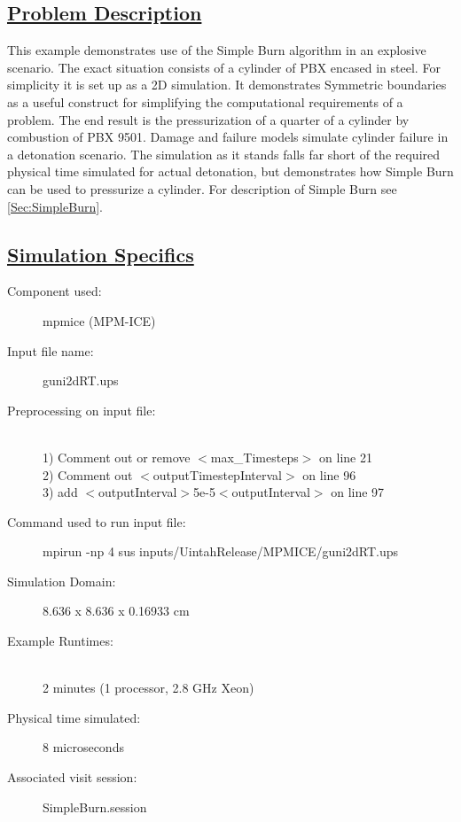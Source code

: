 \subsection*{\underline{Problem Description}}
This example demonstrates use of the Simple Burn algorithm in an explosive scenario.  
The exact situation consists of a cylinder of PBX encased in steel.  For simplicity it is set up 
as a 2D simulation.  It demonstrates Symmetric boundaries as a useful construct for simplifying
the computational requirements of a problem.  The end result is the pressurization of a quarter
of a cylinder by combustion of PBX 9501.  Damage and failure models simulate cylinder failure
in a detonation scenario.  The simulation as it stands falls far short of the required physical time 
simulated for actual detonation, but demonstrates how Simple Burn can be used to pressurize 
a cylinder.  For description of Simple Burn see \ref{Sec:SimpleBurn}.

\subsection*{\underline{Simulation Specifics}}
\begin{description}
\item [Component used:] \hfill mpmice (MPM-ICE)
\item [Input file name:] \hfill guni2dRT.ups
\item [Preprocessing on input file:]\hfill \\ 1) Comment out or remove $<$max\_Timesteps$>$ on line 21 \\
2) Comment out $<$outputTimestepInterval$>$ on line 96 \\ 
3) add $<$outputInterval$>$5e-5$<$outputInterval$>$ on line 97 \\
\item [Command used to run input file:]\hfill mpirun -np 4 sus inputs/UintahRelease/MPMICE/guni2dRT.ups

\item [Simulation Domain:]\hfill    8.636 x 8.636 x 0.16933 cm

\item [Example Runtimes:] \hfill \\
2 minutes   (1 processor, 2.8 GHz Xeon)\\

\item [Physical time simulated:] \hfill 8 microseconds \\ 


\item [Associated visit session:] \hfill SimpleBurn.session

\end{description}

